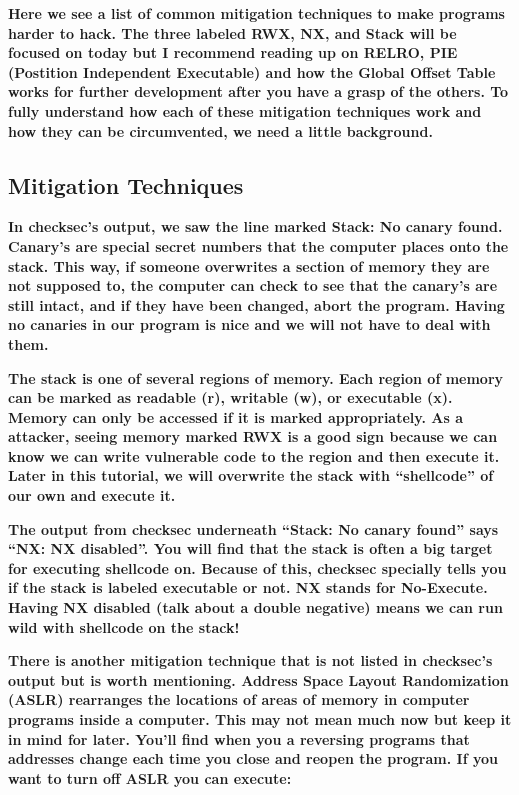 \textbf{Here we see a list of common mitigation techniques to make programs harder to hack. The three labeled RWX, NX,
and Stack will be focused on today but I recommend reading up on RELRO, PIE (Postition Independent Executable) and how
the Global Offset Table works for further development after you have a grasp of the others. To fully understand how
each of these mitigation techniques work and how they can be circumvented, we need a little background.}

\subsection{Mitigation Techniques}

\textbf{In checksec's output, we saw the line marked Stack: No canary found. Canary's are special secret numbers that
the computer places onto the stack. This way, if someone overwrites a section of memory they are not supposed to, the
computer can check to see that the canary's are still intact, and if they have been changed, abort the program. Having
no canaries in our program is nice and we will not have to deal with them.}

\textbf{The stack is one of several regions of memory. Each region of memory can be marked as readable (r), writable
(w), or executable (x). Memory can only be accessed if it is marked appropriately. As a attacker, seeing memory marked
RWX is a good sign because we can know we can write vulnerable code to the region and then execute it. Later in this
tutorial, we will overwrite the stack with ``shellcode'' of our own and execute it.}

\textbf{The output from checksec underneath ``Stack: No canary found'' says ``NX: NX disabled''. You will find that the
stack is often a big target for executing shellcode on. Because of this, checksec specially tells you if the stack is
labeled executable or not. NX stands for No-Execute. Having NX disabled (talk about a double negative) means we can run
wild with shellcode on the stack!}

\textbf{There is another mitigation technique that is not listed in checksec's output but is worth mentioning. Address
Space Layout Randomization (ASLR) rearranges the locations of areas of memory in computer programs inside a computer.
This may not mean much now but keep it in mind for later. You'll find when you a reversing programs that addresses
change each time you close and reopen the program. If you want to turn off ASLR you can execute:}

